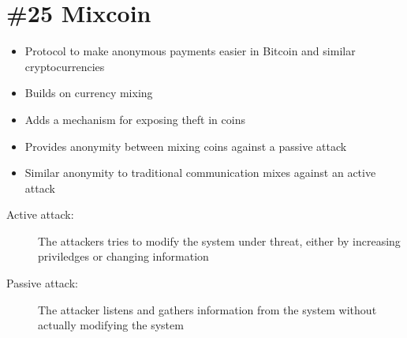 \section{\#25 Mixcoin}
\begin{itemize}
	\item Protocol to make anonymous payments easier in Bitcoin and similar cryptocurrencies
	\item Builds on currency mixing
	\item Adds a mechanism for exposing theft in coins
	\item Provides anonymity between mixing coins against a passive attack
	\item Similar anonymity to traditional communication mixes against an active attack
\end{itemize}
\begin{description}
	\item[Active attack:] The attackers tries to modify the system under threat, either by increasing priviledges or changing information
	\item[Passive attack:] The attacker listens and gathers information from the system without actually modifying the system
\end{description}